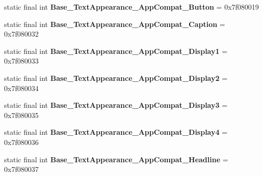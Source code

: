 \begin{DoxyCompactItemize}
\item 
\hypertarget{classandroid_1_1support_1_1design_1_1_r_1_1style_a49e39263b4eb37684aba06a6e360201d}{}static final int {\bfseries Base\+\_\+\+Text\+Appearance\+\_\+\+App\+Compat\+\_\+\+Button} = 0x7f080019\label{classandroid_1_1support_1_1design_1_1_r_1_1style_a49e39263b4eb37684aba06a6e360201d}

\item 
\hypertarget{classandroid_1_1support_1_1design_1_1_r_1_1style_ab01622f4fbc20917df4953bbe0d1c1a7}{}static final int {\bfseries Base\+\_\+\+Text\+Appearance\+\_\+\+App\+Compat\+\_\+\+Caption} = 0x7f080032\label{classandroid_1_1support_1_1design_1_1_r_1_1style_ab01622f4fbc20917df4953bbe0d1c1a7}

\item 
\hypertarget{classandroid_1_1support_1_1design_1_1_r_1_1style_ac11ffe6c88514201d4a71fee6bf6fa1e}{}static final int {\bfseries Base\+\_\+\+Text\+Appearance\+\_\+\+App\+Compat\+\_\+\+Display1} = 0x7f080033\label{classandroid_1_1support_1_1design_1_1_r_1_1style_ac11ffe6c88514201d4a71fee6bf6fa1e}

\item 
\hypertarget{classandroid_1_1support_1_1design_1_1_r_1_1style_a6d3af5c10efbdd0fc2b08e2526b2cbb5}{}static final int {\bfseries Base\+\_\+\+Text\+Appearance\+\_\+\+App\+Compat\+\_\+\+Display2} = 0x7f080034\label{classandroid_1_1support_1_1design_1_1_r_1_1style_a6d3af5c10efbdd0fc2b08e2526b2cbb5}

\item 
\hypertarget{classandroid_1_1support_1_1design_1_1_r_1_1style_a275f10f2ac27d2da0ba760911d80f132}{}static final int {\bfseries Base\+\_\+\+Text\+Appearance\+\_\+\+App\+Compat\+\_\+\+Display3} = 0x7f080035\label{classandroid_1_1support_1_1design_1_1_r_1_1style_a275f10f2ac27d2da0ba760911d80f132}

\item 
\hypertarget{classandroid_1_1support_1_1design_1_1_r_1_1style_a4e66214538390426535adc790a14e781}{}static final int {\bfseries Base\+\_\+\+Text\+Appearance\+\_\+\+App\+Compat\+\_\+\+Display4} = 0x7f080036\label{classandroid_1_1support_1_1design_1_1_r_1_1style_a4e66214538390426535adc790a14e781}

\item 
\hypertarget{classandroid_1_1support_1_1design_1_1_r_1_1style_aac8bfe611719aa125f106f747f4c582e}{}static final int {\bfseries Base\+\_\+\+Text\+Appearance\+\_\+\+App\+Compat\+\_\+\+Headline} = 0x7f080037\label{classandroid_1_1support_1_1design_1_1_r_1_1style_aac8bfe611719aa125f106f747f4c582e}


\end{DoxyCompactItemize}
